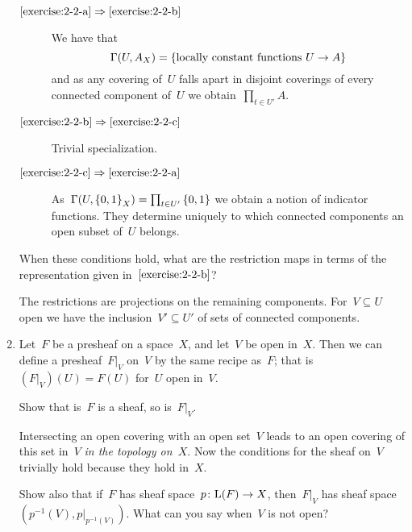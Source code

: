 \documentclass[a4paper,11pt,oneside,openany,article]{memoir}
\begin{document}
\begin{enumerate}
    \begin{solution}
      \begin{description}
        \item[$\ref{exercise:2-2-a}\Rightarrow\ref{exercise:2-2-b}$] We have that
          \begin{equation}
            \mathrm{\Gamma}(U,A_X)=\left\{ \text{locally constant functions~$U\to A$} \right\}
          \end{equation}
          and as any covering of~$U$ falls apart in disjoint coverings of every connected component of~$U$ we obtain~$\prod_{t\in U'}A$.
        \item[$\ref{exercise:2-2-b}\Rightarrow\ref{exercise:2-2-c}$] Trivial specialization.
        \item[$\ref{exercise:2-2-c}\Rightarrow\ref{exercise:2-2-a}$] As~$\mathrm{\Gamma}(U,\left\{ 0,1 \right\}_X)=\prod_{t\in U'}\left\{ 0,1 \right\}$ we obtain a notion of indicator functions. They determine uniquely to which connected components an open subset of~$U$ belongs.
      \end{description}
    \end{solution}

    When these conditions hold, what are the restriction maps in terms of the representation given in~$\ref{exercise:2-2-b}$?

    \begin{solution}
      The restrictions are projections on the remaining components. For~$V\subseteq U$ open we have the inclusion~$V'\subseteq U'$ of sets of connected components.
    \end{solution}

  \item Let~$F$ be a presheaf on a space~$X$, and let~$V$ be open in~$X$. Then we can define a presheaf~$F|_V$ on~$V$ by the same recipe as~$F$; that is~$(F|_V)(U)=F(U)$ for~$U$ open in~$V$.

    Show that is~$F$ is a sheaf, so is~$F|_V$.

    \begin{solution}
      Intersecting an open covering with an open set~$V$ leads to an open covering of this set in~$V$ \emph{in the topology on~$X$}. Now the conditions for the sheaf on~$V$ trivially hold because they hold in~$X$.
    \end{solution}

    Show also that if~$F$ has sheaf space~$p\colon \mathrm{L}(F)\to X$, then~$F|_V$ has sheaf space $(p^{-1}(V),p|_{p^{-1}(V)})$. What can you say when~$V$ is not open?


\end{enumerate}
\end{document}
